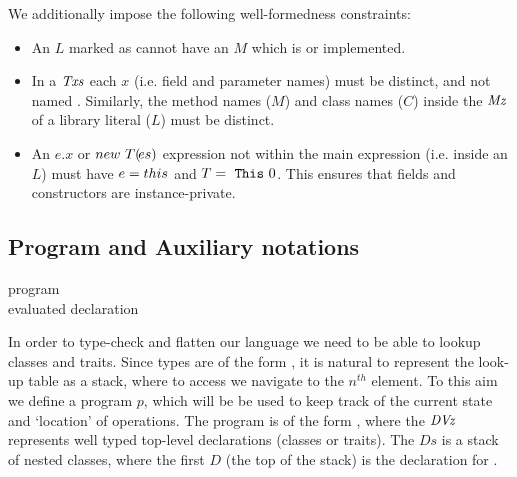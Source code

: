 We additionally impose the following well-formedness  constraints:
\begin{itemize}
\item An $L$ marked as  cannot have an $M$ which is  or implemented. 
\item In a $\mathit{Txs}$ each $x$ (i.e. field and parameter names) must be distinct, and not named . Similarly, the method names ($M$) and class names ($C$) inside the $\mathit{Mz}$ of a library literal ($L$) must be distinct. 
\item An $e.x$ or $\en{T}{es}$ expression not within the main expression (i.e. inside an $L$) must have $e = \Q{this}$ and $T =  \mbox{ {\texttt{This}} } {0}$. This ensures that fields and constructors are instance-private.  

\end{itemize}


\subsection{Program and Auxiliary notations}

\begin{bnf}
	\hline
	 {} {program}\\      {} {evaluated declaration}
	\\\hline
\end{bnf}

In order to type-check and flatten our language we need to be able to lookup classes and traits.
Since types
 are of the form ,
it is natural to represent the look-up table as a
stack, where to access  we
navigate to the $n^{th}$ element.
To this aim we define a program $p$, which will be be used to keep track of the current state and `location' of operations.
The program is of the form , where the $\mathit{DVz}$ represents well typed
top-level declarations (classes or traits). The $Ds$ is a stack of nested classes, where the first $D$ (the top of the stack) is the declaration for .

